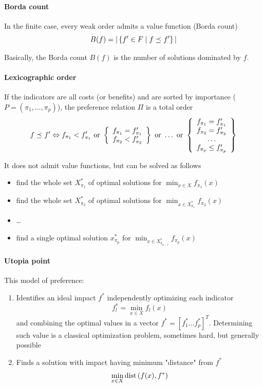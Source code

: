\paragraph{Borda count} In the finite case, every weak order admits a value function (Borda count)
$$ B(f) = |\left\{f' \in F \mid f \preceq_{} f' \right\}|$$

Basically, the Borda count $B(f)$ is the number of solutions dominated by $f$.

\paragraph{Lexicographic order} If the indicators are all costs (or benefits) and are sorted by importance ($P = (\pi_1, \dots, \pi_p)$), the preference relation $\Pi$ is a total order
$$ f \preceq_{} f' \Leftrightarrow f_{\pi_1} < f_{\pi_1}' \text{ or } \left\{
\begin{array}{c}
	f_{\pi_1} = f_{\pi_1}' \\
	f_{\pi_2} < f_{\pi_2}' 
\end{array}\right\} \text{ or } \dots \text{ or } \left\{\begin{array}{c}
f_{\pi_1} = f_{\pi_1}' \\
f_{\pi_2} = f_{\pi_2}'  \\
\dots  \\
f_{\pi_p} \leq f_{\pi_p}'
\end{array}\right\}
$$

It does not admit value functions, but can be solved as follows
\begin{itemize}
	\item find the whole set $X^\ast_{\pi_1}$ of optimal solutions for $\min_{x \in X} f_{\pi_1}(x)$
	
	\item find the whole set $X^\ast_{\pi_2}$ of optimal solutions for $\min_{x \in X^\ast_{\pi_1}} f_{\pi_2}(x)$
	
	\item \dots
	
	\item find a single optimal solution $x^\ast_{\pi_p}$ for $\min_{x \in X^\ast_{\pi_{p-1}}} f_{\pi_p}(x)$
\end{itemize}

\paragraph{Utopia point} This model of preference:
\begin{enumerate}
	\item Identifies an ideal impact $f^\ast$ independently optimizing each indicator
	$$ f_l^\ast = \min_{x \in X} f_l (x) $$
	and combining the optimal values in a vector $f^\ast = \left[f_1^\ast \dots f_p^\ast \right]^T$. Determining such value is a classical optimization problem, sometimes hard, but generally possible
	
	\item Finds a solution with impact having minimum "distance" from $f^\ast$
	$$ \min_{x \in X} \text{dist} \left(f(x), f^\ast \right)$$
\end{enumerate}

